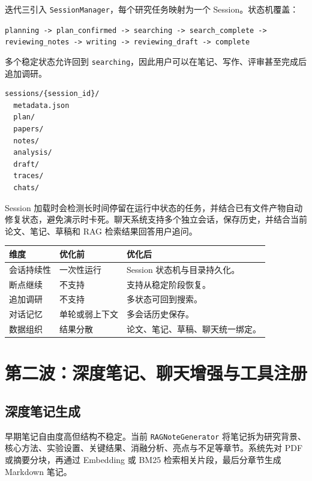 \documentclass[12pt,a4paper,onecolumn]{ctexart}
\newcommand{\code}[1]{\texttt{#1}}
\begin{document}
迭代三引入 \code{SessionManager}，每个研究任务映射为一个 Session。状态机覆盖：

\begin{center}
\code{planning -> plan\_confirmed -> searching -> search\_complete -> reviewing\_notes -> writing -> reviewing\_draft -> complete}
\end{center}

多个稳定状态允许回到 \code{searching}，因此用户可以在笔记、写作、评审甚至完成后追加调研。

\begin{verbatim}
sessions/{session_id}/
  metadata.json
  plan/
  papers/
  notes/
  analysis/
  draft/
  traces/
  chats/
\end{verbatim}

Session 加载时会检测长时间停留在运行中状态的任务，并结合已有文件产物自动修复状态，避免演示时卡死。聊天系统支持多个独立会话，保存历史，并结合当前论文、笔记、草稿和 RAG 检索结果回答用户追问。

\begin{longtable}{p{3.4cm}p{4.8cm}p{4.8cm}}
\toprule
\textbf{维度} & \textbf{优化前} & \textbf{优化后} \\
\midrule
会话持续性 & 一次性运行 & Session 状态机与目录持久化。\\
断点继续 & 不支持 & 支持从稳定阶段恢复。\\
追加调研 & 不支持 & 多状态可回到搜索。\\
对话记忆 & 单轮或弱上下文 & 多会话历史保存。\\
数据组织 & 结果分散 & 论文、笔记、草稿、聊天统一绑定。\\
\bottomrule
\end{longtable}

\section{第二波：深度笔记、聊天增强与工具注册}

\subsection{深度笔记生成}

早期笔记自由度高但结构不稳定。当前 \code{RAGNoteGenerator} 将笔记拆为研究背景、核心方法、实验设置、关键结果、消融分析、亮点与不足等章节。系统先对 PDF 或摘要分块，再通过 Embedding 或 BM25 检索相关片段，最后分章节生成 Markdown 笔记。
\end{document}
